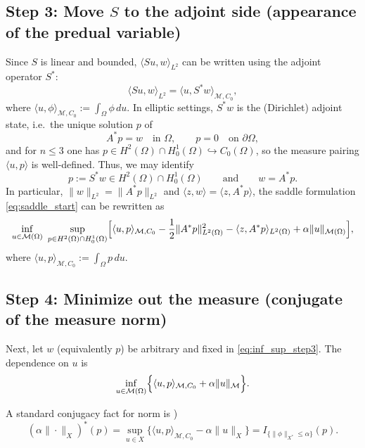 \documentclass[11pt,a4paper]{article}
\begin{document}
\subsection*{Step 3: Move $S$ to the adjoint side (appearance of the predual variable)}
Since $S$ is linear and bounded, $\langle Su,w\rangle_{L^2}$ can be written using the adjoint operator
$S^*$:
\[
\langle Su,w\rangle_{L^2} = \langle u, S^*w\rangle_{\mathcal{M},C_0},
\]
where $\langle u,\phi\rangle_{\mathcal{M},C_0}:=\int_\Omega \phi\,du$.
In elliptic settings, $S^*w$ is the (Dirichlet) adjoint state, i.e.\ the unique solution $p$ of
\begin{equation}\label{eq:adjoint_p}
A^*p = w \quad\text{in }\Omega,\qquad p=0\quad\text{on }\partial\Omega,
\end{equation}
and for $n\le 3$ one has $p\in H^2(\Omega)\cap H^1_0(\Omega)\hookrightarrow C_0(\Omega)$,
so the measure pairing $\langle u,p\rangle$ is well-defined.
Thus, we may identify
\[
p := S^*w \in H^2(\Omega)\cap H^1_0(\Omega)
\qquad\text{and}\qquad
w = A^*p.
\]
In particular, $\|w\|_{L^2}=\|A^*p\|_{L^2}$ and $\langle z,w\rangle=\langle z,A^*p\rangle$, the saddle formulation \eqref{eq:saddle_start} can be rewritten as
\begin{equation}\label{eq:inf_sup_step3}
\inf_{u\in\mathcal{M}(\Omega)}\ \sup_{p\in H^2(\Omega)\cap H^1_0(\Omega)}
\Bigl[
\langle u,p\rangle_{\mathcal{M},C_0}
-\frac12\|A^*p\|_{L^2(\Omega)}^2
-\langle z,A^*p\rangle_{L^2(\Omega)}
+\alpha\|u\|_{\mathcal{M}(\Omega)}
\Bigr],
\end{equation}
where $\langle u,p\rangle_{\mathcal{M},C_0}:=\int_\Omega p\,du$.

\subsection*{Step 4: Minimize out the measure (conjugate of the measure norm)}
Next, let $w$ (equivalently $p$) be arbitrary and fixed  in \eqref{eq:inf_sup_step3}. The dependence on $u$ is
\begin{equation}\label{eq:u-subproblem}
\inf_{u\in\mathcal{M}(\Omega)}
\Bigl\{ \langle u,p\rangle_{\mathcal{M},C_0} + \alpha\|u\|_{\mathcal{M}} \Bigr\}.
\end{equation}

A standard conjugacy fact for norm is \cite{ekelandtemam1999})
\[
(\alpha\|\cdot\|_X)^*(p)
=\sup_{u\in X}\{\langle u,p\rangle_{\mathcal{M},C_0}-\alpha\|u\|_X\}
= I_{\{\|\phi\|_{X^*}\le \alpha\}}(p).\label{eq:saddle_interm}
\]
\end{document}
